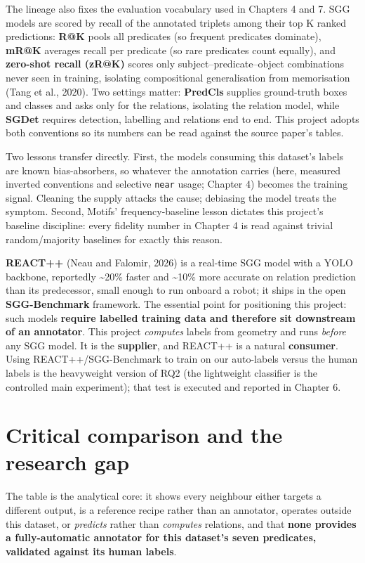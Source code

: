The lineage also fixes the evaluation vocabulary used in Chapters 4 and 7. SGG models are scored by recall of the annotated triplets among their top K ranked predictions: \textbf{R@K} pools all predicates (so frequent predicates dominate), \textbf{mR@K} averages recall per predicate (so rare predicates count equally), and \textbf{zero-shot recall (zR@K)} scores only subject--predicate--object combinations never seen in training, isolating compositional generalisation from memorisation (Tang et al., 2020). Two settings matter: \textbf{PredCls} supplies ground-truth boxes and classes and asks only for the relations, isolating the relation model, while \textbf{SGDet} requires detection, labelling and relations end to end. This project adopts both conventions so its numbers can be read against the source paper's tables.

Two lessons transfer directly. First, the models consuming this dataset's labels are known bias-absorbers, so whatever the annotation carries (here, measured inverted conventions and selective \texttt{near} usage; Chapter 4) becomes the training signal. Cleaning the supply attacks the cause; debiasing the model treats the symptom. Second, Motifs' frequency-baseline lesson dictates this project's baseline discipline: every fidelity number in Chapter 4 is read against trivial random/majority baselines for exactly this reason.

\textbf{REACT++} (Neau and Falomir, 2026) is a real-time SGG model with a YOLO backbone, reportedly \textasciitilde{}20\% faster and \textasciitilde{}10\% more accurate on relation prediction than its predecessor, small enough to run onboard a robot; it ships in the open \textbf{SGG-Benchmark} framework. The essential point for positioning this project: such models \textbf{require labelled training data and therefore sit downstream of an annotator}. This project \textit{computes} labels from geometry and runs \textit{before} any SGG model. It is the \textbf{supplier}, and REACT++ is a natural \textbf{consumer}. Using REACT++/SGG-Benchmark to train on our auto-labels versus the human labels is the heavyweight version of RQ2 (the lightweight classifier is the controlled main experiment); that test is executed and reported in Chapter 6.

\section{Critical comparison and the research gap}

The table is the analytical core: it shows every neighbour either targets a different output, is a reference recipe rather than an annotator, operates outside this dataset, or \textit{predicts} rather than \textit{computes} relations, and that \textbf{none provides a fully-automatic annotator for this dataset's seven predicates, validated against its human labels}.

